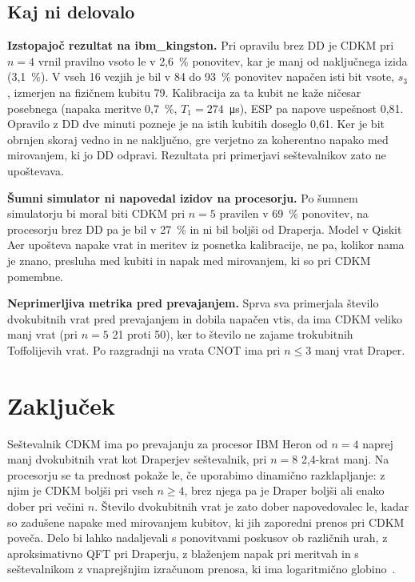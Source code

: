 \subsection{Kaj ni delovalo}
\label{g08:sec:neuspehi}

\smallskip\noindent\textbf{Izstopajoč rezultat na ibm\_kingston.} Pri opravilu brez DD je CDKM pri $n = 4$ vrnil pravilno vsoto le v 2,6~\% ponovitev, kar je manj od naključnega izida (3,1~\%). V vseh 16 vezjih je bil v 84 do 93~\% ponovitev napačen isti bit vsote, $s_3$, izmerjen na fizičnem kubitu 79. Kalibracija za ta kubit ne kaže ničesar posebnega (napaka meritve 0,7~\%, $T_1 = 274$~\si{\micro\second}), ESP pa napove uspešnost 0,81. Opravilo z DD dve minuti pozneje je na istih kubitih doseglo 0,61. Ker je bit obrnjen skoraj vedno in ne naključno, gre verjetno za koherentno napako med mirovanjem, ki jo DD odpravi. Rezultata pri primerjavi seštevalnikov zato ne upoštevava.

\smallskip\noindent\textbf{Šumni simulator ni napovedal izidov na procesorju.} Po šumnem simulatorju bi moral biti CDKM pri $n = 5$ pravilen v 69~\% ponovitev, na procesorju brez DD pa je bil v 27~\% in ni bil boljši od Draperja. Model v Qiskit Aer upošteva napake vrat in meritev iz posnetka kalibracije, ne pa, kolikor nama je znano, presluha med kubiti in napak med mirovanjem, ki so pri CDKM pomembne.

\smallskip\noindent\textbf{Neprimerljiva metrika pred prevajanjem.} Sprva sva primerjala število dvokubitnih vrat pred prevajanjem in dobila napačen vtis, da ima CDKM veliko manj vrat (pri $n = 5$ 21 proti 50), ker to število ne zajame trokubitnih Toffolijevih vrat. Po razgradnji na vrata CNOT ima pri $n \le 3$ manj vrat Draper.


\section{Zaključek}
\label{g08:sec:zakljucek}

Seštevalnik CDKM ima po prevajanju za procesor IBM Heron od $n = 4$ naprej manj dvokubitnih vrat kot Draperjev seštevalnik, pri $n = 8$ 2,4-krat manj. Na procesorju se ta prednost pokaže le, če uporabimo dinamično razklapljanje: z njim je CDKM boljši pri vseh $n \ge 4$, brez njega pa je Draper boljši ali enako dober pri večini $n$. Število dvokubitnih vrat je zato dober napovedovalec le, kadar so zadušene napake med mirovanjem kubitov, ki jih zaporedni prenos pri CDKM poveča. Delo bi lahko nadaljevali s ponovitvami poskusov ob različnih urah, z aproksimativno QFT pri Draperju, z blaženjem napak pri meritvah in s seštevalnikom z vnaprejšnjim izračunom prenosa, ki ima logaritmično globino~\cite{g08:draper2006}.


